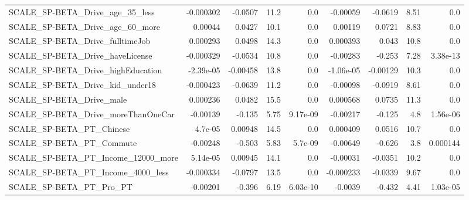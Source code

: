 \begin{tabular}{lrrrrrrrr}
SCALE\_SP-BETA\_Drive\_age\_35\_less                    &   -0.000302 &      -0.0507 &      11.2 &      0.0 &   -0.00059 &     -0.0619 &         8.51 &           0.0 \\
SCALE\_SP-BETA\_Drive\_age\_60\_more                    &     0.00044 &       0.0427 &      10.1 &      0.0 &    0.00119 &      0.0721 &         8.83 &           0.0 \\
SCALE\_SP-BETA\_Drive\_fulltimeJob                    &    0.000293 &       0.0498 &      14.3 &      0.0 &   0.000393 &       0.043 &         10.8 &           0.0 \\
SCALE\_SP-BETA\_Drive\_haveLicense                    &   -0.000329 &      -0.0534 &      10.8 &      0.0 &   -0.00283 &      -0.253 &         7.28 &      3.38e-13 \\
SCALE\_SP-BETA\_Drive\_highEducation                  &   -2.39e-05 &     -0.00458 &      13.8 &      0.0 &  -1.06e-05 &    -0.00129 &         10.3 &           0.0 \\
SCALE\_SP-BETA\_Drive\_kid\_under18                    &   -0.000423 &      -0.0639 &      11.2 &      0.0 &   -0.00098 &     -0.0919 &         8.61 &           0.0 \\
SCALE\_SP-BETA\_Drive\_male                           &    0.000236 &       0.0482 &      15.5 &      0.0 &   0.000568 &      0.0735 &         11.3 &           0.0 \\
SCALE\_SP-BETA\_Drive\_moreThanOneCar                 &    -0.00139 &       -0.135 &      5.75 & 9.17e-09 &   -0.00217 &      -0.125 &          4.8 &      1.56e-06 \\
SCALE\_SP-BETA\_PT\_Chinese                           &     4.7e-05 &      0.00948 &      14.5 &      0.0 &   0.000409 &      0.0516 &         10.7 &           0.0 \\
SCALE\_SP-BETA\_PT\_Commute                           &    -0.00248 &       -0.503 &      5.83 &  5.7e-09 &   -0.00649 &      -0.626 &          3.8 &      0.000144 \\
SCALE\_SP-BETA\_PT\_Income\_12000\_more                 &    5.14e-05 &      0.00945 &      14.1 &      0.0 &   -0.00031 &     -0.0351 &         10.2 &           0.0 \\
SCALE\_SP-BETA\_PT\_Income\_4000\_less                  &   -0.000334 &      -0.0797 &      13.5 &      0.0 &  -0.000233 &     -0.0339 &         9.67 &           0.0 \\
SCALE\_SP-BETA\_PT\_Pro\_PT                            &    -0.00201 &       -0.396 &      6.19 & 6.03e-10 &    -0.0039 &      -0.432 &         4.41 &      1.03e-05 \\

\end{tabular}
